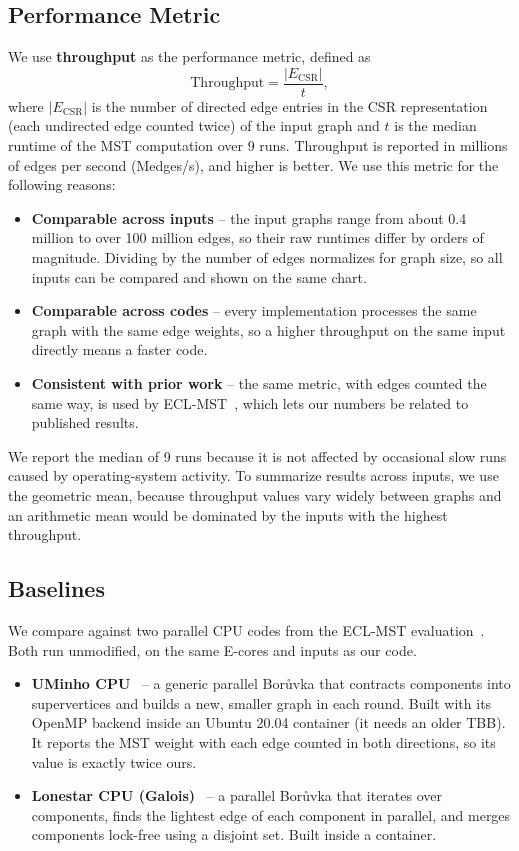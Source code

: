 \documentclass[11pt,a4paper]{article}
\begin{document}
\subsection*{Performance Metric}
We use \textbf{throughput} as the performance metric, defined as
\[
  \text{Throughput} = \frac{|E_{\text{CSR}}|}{t},
\]
where $|E_{\text{CSR}}|$ is the number of directed edge entries in the CSR representation (each undirected edge counted twice) of the input graph and $t$ is the median runtime of the MST computation over 9 runs. Throughput is reported in millions of edges per second (Medges/s), and higher is better. We use this metric for the following reasons:
\begin{itemize}
  \item \textbf{Comparable across inputs} -- the input graphs range from about 0.4 million to over 100 million edges, so their raw runtimes differ by orders of magnitude. Dividing by the number of edges normalizes for graph size, so all inputs can be compared and shown on the same chart.
  \item \textbf{Comparable across codes} -- every implementation processes the same graph with the same edge weights, so a higher throughput on the same input directly means a faster code.
  \item \textbf{Consistent with prior work} -- the same metric, with edges counted the same way, is used by ECL-MST~\cite{fallin2023eclmst}, which lets our numbers be related to published results.
\end{itemize}

We report the median of 9 runs because it is not affected by occasional slow runs caused by operating-system activity. To summarize results across inputs, we use the geometric mean, because throughput values vary widely between graphs and an arithmetic mean would be dominated by the inputs with the highest throughput.

\subsection*{Baselines}
We compare against two parallel CPU codes from the ECL-MST evaluation~\cite{fallin2023eclmst}. Both run unmodified, on the same E-cores and inputs as our code.
\begin{itemize}
  \item \textbf{UMinho CPU}~\cite{mariano2015boruvka} -- a generic parallel Bor\r{u}vka that contracts components into supervertices and builds a new, smaller graph in each round. Built with its OpenMP backend inside an Ubuntu 20.04 container (it needs an older TBB). It reports the MST weight with each edge counted in both directions, so its value is exactly twice ours. 

  \item \textbf{Lonestar CPU (Galois)}~\cite{galois} -- a parallel Bor\r{u}vka that iterates over components, finds the lightest edge of each component in parallel, and merges components lock-free using a disjoint set. Built inside a container.
  
\end{itemize}
\end{document}
